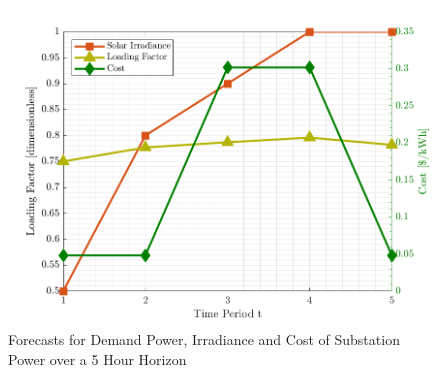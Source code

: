 \documentclass[../../outputs/main.tex]{subfiles}
\begin{document}
\begin{figure}[h!]
    \centering
    \includegraphics[height=0.25\textheight]{../figures/T5-inputCurves/InputCurves_Horizon_5.png}
    \caption{Forecasts for Demand Power, Irradiance and Cost of Substation Power over a 5 Hour Horizon}
    \label{fig:inputCurve-5}
\end{figure}
\end{document}
